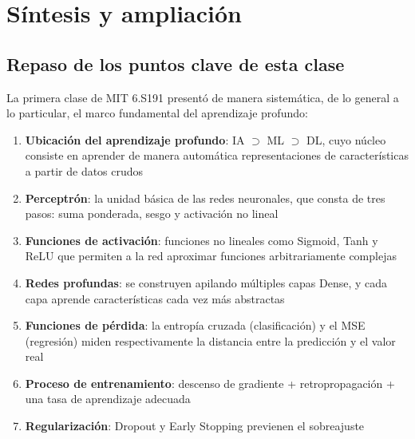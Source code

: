\section{Síntesis y ampliación}

\subsection{Repaso de los puntos clave de esta clase}

La primera clase de MIT 6.S191 presentó de manera sistemática, de lo general a lo particular, el marco fundamental del aprendizaje profundo:

\begin{enumerate}
\item \textbf{Ubicación del aprendizaje profundo}: IA $\supset$ ML $\supset$ DL, cuyo núcleo consiste en aprender de manera automática representaciones de características a partir de datos crudos
\item \textbf{Perceptrón}: la unidad básica de las redes neuronales, que consta de tres pasos: suma ponderada, sesgo y activación no lineal
\item \textbf{Funciones de activación}: funciones no lineales como Sigmoid, Tanh y ReLU que permiten a la red aproximar funciones arbitrariamente complejas
\item \textbf{Redes profundas}: se construyen apilando múltiples capas Dense, y cada capa aprende características cada vez más abstractas
\item \textbf{Funciones de pérdida}: la entropía cruzada (clasificación) y el MSE (regresión) miden respectivamente la distancia entre la predicción y el valor real
\item \textbf{Proceso de entrenamiento}: descenso de gradiente + retropropagación + una tasa de aprendizaje adecuada
\item \textbf{Regularización}: Dropout y Early Stopping previenen el sobreajuste
\end{enumerate}

